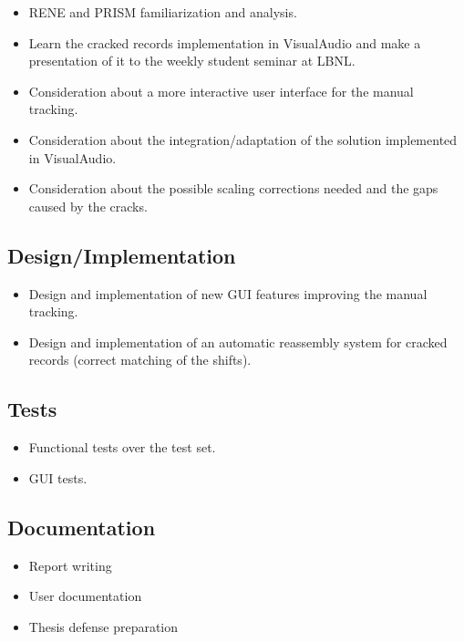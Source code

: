 \begin{itemize}
    \item RENE and PRISM familiarization and analysis.
    \item Learn the cracked records implementation in VisualAudio and make a presentation of it to the weekly student seminar at LBNL.
    \item Consideration about a more interactive user interface for the manual tracking.
    \item Consideration about the integration/adaptation of the solution implemented in VisualAudio.
    \item Consideration about the possible scaling corrections needed and the gaps caused by the cracks.
\end{itemize}

\subsection{Design/Implementation}

\begin{itemize}
    \item Design and implementation of new GUI features improving the manual tracking.
    \item Design and implementation of an automatic reassembly system for cracked records (correct matching of the shifts).
\end{itemize}

\subsection{Tests}

\begin{itemize}
    \item Functional tests over the test set.
    \item GUI tests.
\end{itemize}

\subsection{Documentation}

\begin{itemize}
    \item Report writing
    \item User documentation
    \item Thesis defense preparation
\end{itemize}

